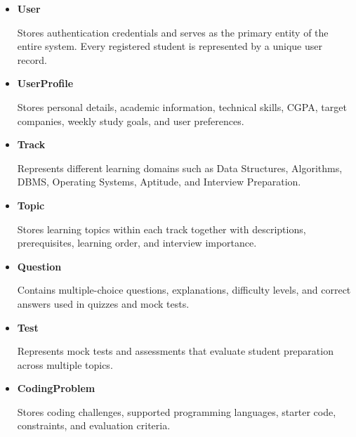 \begin{itemize}

\item \textbf{User}

Stores authentication credentials and serves as the primary entity of the entire system. Every registered student is represented by a unique user record.

\vspace{0.1cm}

\item \textbf{UserProfile}

Stores personal details, academic information, technical skills, CGPA, target companies, weekly study goals, and user preferences.

\vspace{0.1cm}

\item \textbf{Track}

Represents different learning domains such as Data Structures, Algorithms, DBMS, Operating Systems, Aptitude, and Interview Preparation.

\vspace{0.1cm}

\item \textbf{Topic}

Stores learning topics within each track together with descriptions, prerequisites, learning order, and interview importance.

\vspace{0.1cm}

\item \textbf{Question}

Contains multiple-choice questions, explanations, difficulty levels, and correct answers used in quizzes and mock tests.

\vspace{0.1cm}

\item \textbf{Test}

Represents mock tests and assessments that evaluate student preparation across multiple topics.

\vspace{0.1cm}

\item \textbf{CodingProblem}

Stores coding challenges, supported programming languages, starter code, constraints, and evaluation criteria.

\vspace{0.1cm}


\end{itemize}
